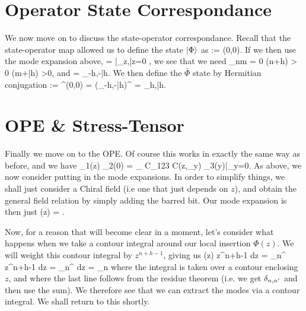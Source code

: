 \section{Operator State Correspondance}

We now move on to discuss the state-operator correspondance. Recall that the state-operator map allowed us to define the state $\ket{\Phi}$ as
\bse 
    \ket{\Phi} := \Phi(0,0).
\ese 
If we then use the mode expansion above,
\bse 
    \ket{\Phi} = \sum {}\bigg|_{z,\bar{z}=0} ,
\ese
we see that we need 
\bse 
    \varphi_{nm} = 0 \qquad \forall (n+h) > 0 \qand (m+\bar{h}) >0,
\ese
and 
\bse 
    \ket{\Phi} = \varphi_{-h,-\bar{h}}.
\ese 
We then define the $\bar{\Phi}$ state by Hermitian conjugation
\bse 
    \bra{\Phi} := \Phi^{\dagger}(0,0) =  \big(\varphi_{-h,-\bar{h}}\big)^{\dagger} = \varphi_{h,\bar{h}}.
\ese 

\section{OPE \& Stress-Tensor}

Finally we move on to the OPE. Of course this works in exactly the same way as before, and we have
\bse 
    \Phi_1(z) \Phi_2(0) = \sum_{} C_{123} C(z,\p_y) \Phi_3(y)\big|_{y=0}.
\ese 
As above, we now consider putting in the mode expansions. In order to simplify things, we shall just consider a Chiral field (i.e one that just depends on $z$), and obtain the general field relation by simply adding the barred bit. Our mode expansion is then just
\bse 
    \Phi(z) = \sum {}.
\ese 

Now, for a reason that will become clear in a moment, let's consider what happens when we take a contour integral around our local insertion $\Phi(z)$. We will weight this contour integral by $z^{n+h-1}$, giving us
\bse
    \oint \Phi(z) z^{n+h-1} dz =  \oint \sum_{n^{\prime}}  z^{n+h-1} dz =  \oint \sum_{n^{\prime}}   dz = \varphi_n
\ese 
where the integral is taken over a contour enclosing $z$, and where  the last line follows from the residue theorem (i.e. we get $\delta_{n,n^{\prime}}$ and then use the sum). We therefore see that we can extract the modes via a contour integral. We shall return to this shortly.

